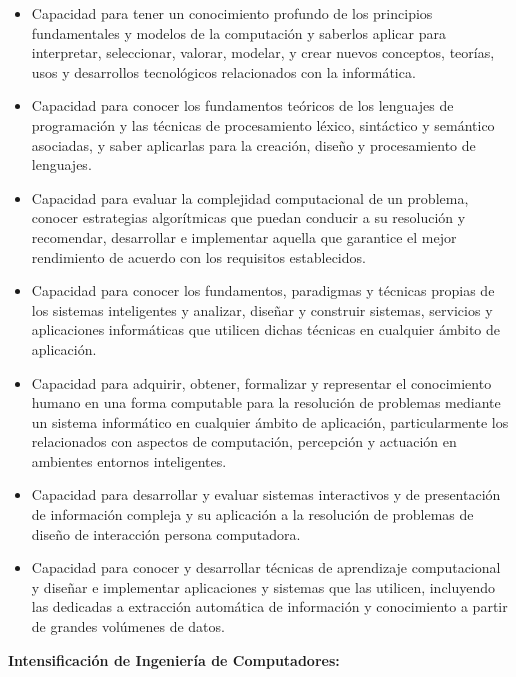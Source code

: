 \documentclass[a4paper]{article}
\newcommand\liststyleLvii{%
\renewcommand\labelitemi{{\textbullet}}
\renewcommand\labelitemii{{\textbullet}}
\renewcommand\labelitemiii{{\textbullet}}
\renewcommand\labelitemiv{{\textbullet}}
}
\begin{document}
\liststyleLvii
\begin{itemize}
\item Capacidad para tener un conocimiento profundo de los principios fundamentales y modelos de la computaci\'on y
saberlos aplicar para interpretar, seleccionar, valorar, modelar, y crear nuevos conceptos, teor\'ias, usos y
desarrollos tecnol\'ogicos relacionados con la inform\'atica.
\item Capacidad para conocer los fundamentos te\'oricos de los lenguajes de programaci\'on y las t\'ecnicas de
procesamiento l\'exico, sint\'actico y sem\'antico asociadas, y saber aplicarlas para la creaci\'on, dise\~no y
procesamiento de lenguajes.
\item Capacidad para evaluar la complejidad computacional de un problema, conocer estrategias algor\'itmicas que puedan
conducir a su resoluci\'on y recomendar, desarrollar e implementar aquella que garantice el mejor rendimiento de
acuerdo con los requisitos establecidos.
\item Capacidad para conocer los fundamentos, paradigmas y t\'ecnicas propias de los sistemas inteligentes y analizar,
dise\~nar y construir sistemas, servicios y aplicaciones inform\'aticas que utilicen dichas t\'ecnicas en cualquier
\'ambito de aplicaci\'on.
\item Capacidad para adquirir, obtener, formalizar y representar el conocimiento humano en una forma computable para la
resoluci\'on de problemas mediante un sistema inform\'atico en cualquier \'ambito de aplicaci\'on, particularmente los
relacionados con aspectos de computaci\'on, percepci\'on y actuaci\'on en ambientes entornos inteligentes.
\item Capacidad para desarrollar y evaluar sistemas interactivos y de presentaci\'on de informaci\'on compleja y su
aplicaci\'on a la resoluci\'on de problemas de dise\~no de interacci\'on persona computadora.
\item Capacidad para conocer y desarrollar t\'ecnicas de aprendizaje computacional y dise\~nar e implementar
aplicaciones y sistemas que las utilicen, incluyendo las dedicadas a extracci\'on autom\'atica de informaci\'on y
conocimiento a partir de grandes vol\'umenes de datos.
\end{itemize}
{\bfseries
Intensificaci\'on de Ingenier\'ia de Computadores:}
\end{document}

